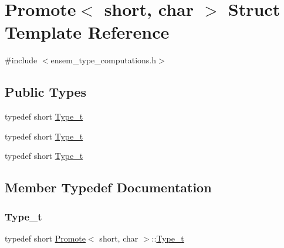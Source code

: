 \hypertarget{structPromote_3_01short_00_01char_01_4}{}\section{Promote$<$ short, char $>$ Struct Template Reference}
\label{structPromote_3_01short_00_01char_01_4}


{\ttfamily \#include $<$ensem\+\_\+type\+\_\+computations.\+h$>$}

\subsection*{Public Types}
\begin{DoxyCompactItemize}
\item 
typedef short \mbox{\hyperlink{structPromote_3_01short_00_01char_01_4_ad7373b6a3ec65f1b36fa8c03e0f390f6}{Type\+\_\+t}}
\item 
typedef short \mbox{\hyperlink{structPromote_3_01short_00_01char_01_4_ad7373b6a3ec65f1b36fa8c03e0f390f6}{Type\+\_\+t}}
\item 
typedef short \mbox{\hyperlink{structPromote_3_01short_00_01char_01_4_ad7373b6a3ec65f1b36fa8c03e0f390f6}{Type\+\_\+t}}
\end{DoxyCompactItemize}


\subsection{Member Typedef Documentation}
\mbox{\label{structPromote_3_01short_00_01char_01_4_ad7373b6a3ec65f1b36fa8c03e0f390f6}} 
\subsubsection{\texorpdfstring{Type\_t}{Type\_t}\hspace{0.1cm}{\footnotesize\ttfamily [1/3]}}
{\footnotesize\ttfamily typedef short \mbox{\hyperlink{structPromote}{Promote}}$<$ short, char $>$\+::\mbox{\hyperlink{structPromote_3_01short_00_01char_01_4_ad7373b6a3ec65f1b36fa8c03e0f390f6}{Type\+\_\+t}}}

\mbox{\label{structPromote_3_01short_00_01char_01_4_ad7373b6a3ec65f1b36fa8c03e0f390f6}} 
